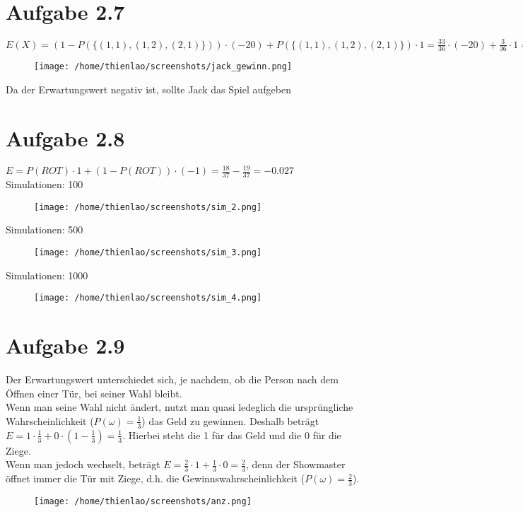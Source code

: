 \documentclass{article}
\begin{document}
	\section*{Aufgabe 2.7}
	$E(X) = (1 -P(\{(1, 1), (1, 2), (2, 1)\})) \cdot (-20) + P(\{(1, 1), (1, 2), (2, 1)\}) \cdot 1 = \frac{33}{36} \cdot (-20) + \frac{3}{36} \cdot 1 = -\frac{27}{36} = -0.75$ \\
	
	\begin{figure} [h]
		\centering
		\texttt{[image: /home/thienlao/screenshots/jack\_gewinn.png]}
	\end{figure}
	\vspace{5pt}
	Da der Erwartungswert negativ ist, sollte Jack das Spiel aufgeben
	
	\section*{Aufgabe 2.8}
	$E = P(ROT) \cdot 1 + (1 - P(ROT)) \cdot (-1) = \frac{18}{37} - \frac{19}{37} = -0.027$ \\
	\newline
	Simulationen: 100
	
	\begin{figure} [h]
		\centering
		\texttt{[image: /home/thienlao/screenshots/sim\_2.png]}
	\end{figure}
	\pagebreak
	Simulationen: 500
	\begin{figure} [h]
		\centering
		\texttt{[image: /home/thienlao/screenshots/sim\_3.png]}
	\end{figure}
	
	Simulationen: 1000
	
	\begin{figure} [h]
		\centering
		\texttt{[image: /home/thienlao/screenshots/sim\_4.png]}
	\end{figure}
	\pagebreak
	
	\section*{Aufgabe 2.9}
	Der Erwartungswert unterschiedet sich, je nachdem, ob die Person nach dem Öffnen einer Tür, bei seiner Wahl bleibt. \\
	\newline
	Wenn man seine Wahl nicht ändert, nutzt man quasi ledeglich die ursprüngliche Wahrscheinlichkeit ($P(\omega)=\frac{1}{3}$) das Geld zu gewinnen. Deshalb beträgt $E = 1 \cdot \frac{1}{3} + 0 \cdot (1 - \frac{1}{3}) = \frac{1}{3}$. Hierbei steht die 1 für das Geld und die 0 für die Ziege. \\
	\newline
	Wenn man jedoch wechselt, beträgt $E = \frac{2}{3} \cdot 1 + \frac{1}{3} \cdot 0 = \frac{2}{3}$, denn der Showmaster öffnet immer die Tür mit Ziege, d.h. die Gewinnswahrscheinlichkeit ($P(\omega) = \frac{2}{3}$). \\
	
	 \begin{figure} [h]
	 	\centering
	 	\texttt{[image: /home/thienlao/screenshots/anz.png]}
	 \end{figure}
	
	
	
	 
	

	
	
	
	
	
		

	
		
	
\end{document}
